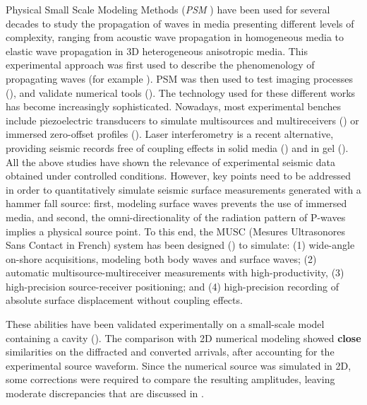 \documentclass[extra,mreferee]{gji}
\newcommand{\psm}{\textit{PSM} }
\begin{document}
Physical Small Scale Modeling Methods (\psm) have been used for several decades to study the propagation of waves in media presenting different levels of complexity, ranging from acoustic wave propagation in homogeneous media to elastic wave propagation in 3D heterogeneous anisotropic media. This experimental approach was first used to describe the phenomenology of propagating waves (for example \cite{rieber1936ewp,howes1953sms,oliver1954two,angona1960two,obrien1971model}). PSM was then used to test imaging processes (\cite{hilterman1970tdm,french1974mrp,bishop1985lvm,pratt1999fwi,mo2015development}), and validate numerical tools (\cite{favretto2013nmt}). The technology used for these different works has become increasingly sophisticated. Nowadays, most experimental benches include piezoelectric transducers to simulate multisources and multireceivers (\cite{wong2009spm}) or immersed zero-offset profiles (\cite{favretto2013nmt}). Laser interferometry is a recent alternative, providing seismic records free of coupling effects in solid media (\cite{bodet2005swi,vanwijk2006eir,bretaudeau2011ssm,bretaudeau2013fwi}) and in gel (\cite{decaqueray2011ewi}). All the above studies have shown the relevance of experimental seismic data obtained under controlled conditions. However, key points need to be addressed in order to quantitatively simulate seismic surface measurements generated with a hammer fall source: first, modeling surface waves prevents the use of immersed media, and second, the omni-directionality of the radiation pattern of P-waves implies a physical source point. To this end, the MUSC (Mesures Ultrasonores Sans Contact in French) system has been designed (\cite{bretaudeau2011ssm}) to simulate: (1) wide-angle on-shore acquisitions, modeling both body waves and surface waves; (2) automatic multisource-multireceiver measurements with high-productivity, (3) high-precision source-receiver positioning; and (4) high-precision recording of absolute surface displacement without coupling effects. 

These abilities have been validated experimentally on a small-scale model containing a cavity (\cite{bretaudeau2011ssm}). The comparison with 2D numerical modeling showed \textbf{close} similarities on the diffracted and converted arrivals, after accounting for the experimental source waveform. Since the numerical source was simulated in 2D, some corrections were required to compare the resulting amplitudes, leaving moderate discrepancies that are discussed in \cite{bretaudeau2011ssm}. 
\end{document}

